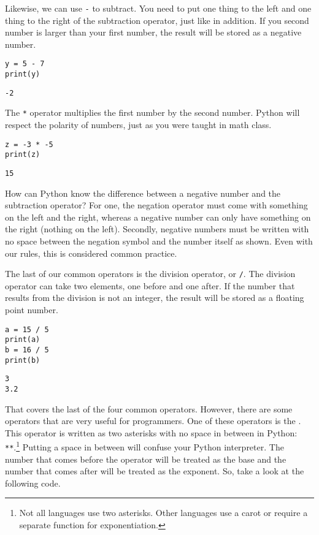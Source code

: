 Likewise, we can use \verb|-| to subtract. You need to put one thing to the left and one thing to the right of the subtraction operator, just like in addition. If you second number is larger than your first number, the result will be stored as a negative number.\par
\begin{lstlisting}[style=pippython]
y = 5 - 7
print(y)
\end{lstlisting}
\begin{lstlisting}[style=none]
-2
\end{lstlisting}
The \verb|*| operator multiplies the first number by the second number. Python will respect the polarity of numbers, just as you were taught in math class.\par
\begin{lstlisting}[style=pippython]
z = -3 * -5
print(z)
\end{lstlisting}
\begin{lstlisting}[style=none]
15
\end{lstlisting}
How can Python know the difference between a negative number and the subtraction operator? For one, the negation operator must come with something on the left and the right, whereas a negative number can only have something on the right (nothing on the left). Secondly, negative numbers must be written with no space between the negation symbol and the number itself as shown. Even with our  rules, this is considered common practice.\par
The last of our common operators is the division operator, or \verb|/|. The division operator can take two elements, one before and one after. If the number that results from the division is not an integer, the result will be stored as a floating point number.\par
\begin{lstlisting}[style=pippython]
a = 15 / 5
print(a)
b = 16 / 5
print(b)
\end{lstlisting}
\begin{lstlisting}[style=none]
3
3.2
\end{lstlisting}
That covers the last of the four common operators. However, there are some operators that are very useful for programmers. One of these operators is the . This operator is written as two asterisks with no space in between in Python: \verb|**|.\footnote{Not all languages use two asterisks. Other languages use a carot or require a separate function for exponentiation.} Putting a space in between will confuse your Python interpreter. The number that comes before the operator will be treated as the base and the number that comes after will be treated as the exponent. So, take a look at the following code.\par
